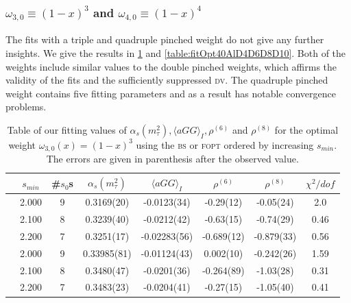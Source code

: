 \documentclass[../../index.tex]{subfiles}
\begin{document}
\subsubsection{\( \omega_{3,0} \equiv (1-x)^3\) and \(\omega_{4,0} \equiv
  (1-x)^4\)}
The fits with a triple and quadruple pinched weight do not give any further
insights. We give the results in \cref{table:fitOpt30AlD4D6D8} and
\cref{table:fitOpt40AlD4D6D8D10}. Both of the weights include similar values to
the double pinched weights, which affirms the validity of the fits and the
sufficiently suppressed \textsc{dv}. The quadruple pinched weight contains five
fitting parameters and as a result has notable convergence problems.
\begin{table}
  \centering
  \begin{tabular}{cccccccc}
    \toprule
    & \(s_{min}\) & \#\(s_0\)s & \(\alpha_s(m_\tau^2)\) & \(\langle aGG \rangle_I\) & \(\rho^{(6)}\) & \(\rho^{(8)}\) & \(\chi^2/dof\)  \\
    \midrule
    \parbox[t]{2mm}{}
    & 2.000 & 9 & 0.3169(20) & -0.0123(34) & -0.29(12) & -0.05(24) & 2.0 \\
    & 2.100 & 8 & 0.3239(40) & -0.0212(42) & -0.63(15) & -0.74(29) & 0.46 \\
    & 2.200 & 7 & 0.3251(17) & -0.02283(56) & -0.689(12) & -0.879(33) & 0.56 \\
    \midrule
    \parbox[t]{2mm}{}
    & 2.000 & 9  & 0.33985(81) & -0.01124(43) & 0.002(10) & -0.242(26) & 1.59 \\
    & 2.100 & 8  & 0.3480(47) & -0.0201(36) & -0.264(89) & -1.03(28) & 0.31 \\
    & 2.200 & 7  & 0.3483(23) & -0.0204(41) & -0.27(15) & -1.05(40) & 0.41 \\
    \bottomrule
  \end{tabular}
  \caption{Table of our fitting values of \(\alpha_s(m_\tau^2), \langle aGG
    \rangle_I, \rho^{(6)}\) and \(\rho^{(8)}\) for the optimal weight
    \(\omega_{3,0}(x)=(1-x)^3\) using the \textsc{bs} or \textsc{fopt} ordered
    by increasing \(s_{min}\). The errors are given in parenthesis after the
    observed value.}
  \label{table:fitOpt30AlD4D6D8}
\end{table}
\end{document}
